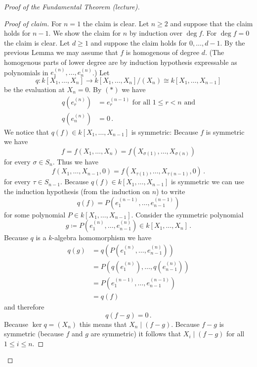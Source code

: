 \begin{proof}[Proof of the Fundamental Theorem (lecture)]
\begin{proof}[Proof of claim]
    For $n = 1$ the claim is clear. Let $n \geq 2$ and suppose that the claim holds for $n-1$.
    We show the claim for $n$ by induction over $\deg f$.
    For $\deg f = 0$ the claim is clear.
    Let $d \geq 1$ and suppose the claim holds for $0, \dotsc, d-1$.
    By the previous Lemma we may assume that $f$ is homogenous of degree $d$.
    (The homogenous parts of lower degree are by induction hypothesis expressable as polynomials in $e^{(n)}_1, \dotsc, e^{(n)}_n$.)
    Let
    \[
              q
      \colon  k[X_1, \dotsc, X_n]
      \to     k[X_1, \dotsc, X_n]/(X_n)
      \cong   k[X_1, \dotsc, X_{n-1}]
    \]
    be the evaluation at $X_n = 0$.
    By $(\ast)$ we have
    \begin{align*}
          q\left( e^{(n)}_r \right)
      &=  e^{(n-1)}_r
      \text{ for all } 1 \leq r < n
      \text{ and}
      \\
          q\left( e^{(n)}_n \right)
      &=  0 \,.
    \end{align*}
    We notice that $q(f) \in k[X_1, \dotsc, X_{n-1}]$ is symmetric:
    Because $f$ is symmetric we have
    \[
        f
      = f(X_1, \dotsc, X_n)
      = f(X_{\sigma(1)}, \dotsc, X_{\sigma(n)})
    \]
    for every $\sigma \in S_n$.
    Thus we have
    \[
        f(X_1, \dotsc, X_{n-1}, 0)
      = f(X_{\tau(1)}, \dotsc, X_{\tau(n-1)}, 0) \,.
    \]
    for every $\tau \in S_{n-1}$.
    Because $q(f) \in k[X_1, \dotsc, X_{n-1}]$ is symmetric we can use the induction hypothesis (from the induction on $n$) to write
    \[
        q(f)
      = P\left( e^{(n-1)}_1, \dotsc, e^{(n-1)}_{n-1} \right)
    \]
    for some polynomial $P \in k[X_1, \dotsc, X_{n-1}]$.
    Consider the symmetric polynomial
    \[
                g
      \coloneqq P\left( e^{(n)}_1, \dotsc, e^{(n)}_{n-1} \right)
      \in       k[X_1, \dotsc, X_n] \,.
    \]
    Because $q$ is a $k$-algebra homomorphism we have
    \begin{align*}
         q(g)
      &= q\left( P\left(e^{(n)}_1, \dotsc, e^{(n)}_{n-1}\right) \right) \\
      &= P\left( q\left(e^{(n)}_1\right), \dotsc, q\left(e^{(n)}_{n-1}\right) \right) \\
      &= P\left( e^{(n-1)}_1, \dotsc, e^{(n-1)}_{n-1} \right) \\
      &= q(f)
    \end{align*}
    and therefore
    \[
        q(f - g)
      = 0 \,.
    \]
    Because $\ker q = (X_n)$ this means that $X_n \mid (f-g)$.
    Because $f-g$ is symmetric (because $f$ and $g$ are symmetric) it follows that $X_i \mid (f-g)$ for all $1 \leq i \leq n$.

\end{proof}
\end{proof}
